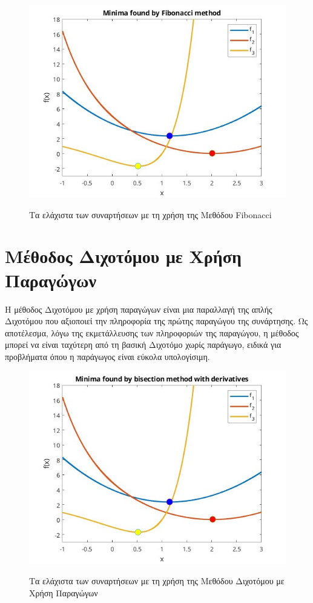 \begin{figure}[H]
    \includegraphics[scale=0.7]{plots/prereqs/fib.jpg}
    \label{fig:funcs}
    \caption{Τα ελάχιστα των συναρτήσεων με τη χρήση της Μεθόδου  Fibonacci}
    \centering
\end{figure}

\section{Μέθοδος Διχοτόμου με Χρήση Παραγώγων}
Η μέθοδος Διχοτόμου με χρήση παραγώγων είναι μια παραλλαγή της απλής Διχοτόμου που αξιοποιεί την πληροφορία της πρώτης παραγώγου της συνάρτησης. Ως αποτέλεσμα, λόγω της εκμετάλλευσης των πληροφοριών της παραγώγου, η μέθοδος μπορεί να είναι ταχύτερη από τη βασική Διχοτόμο χωρίς παράγωγο, ειδικά για προβλήματα όπου η παράγωγος είναι εύκολα υπολογίσιμη.

\begin{figure}[H]
    \includegraphics[scale=0.7]{plots/prereqs/bmd.jpg}
    \label{fig:funcs}
    \caption{Τα ελάχιστα των συναρτήσεων με τη χρήση της Μεθόδου Διχοτόμου με Χρήση Παραγώγων}
    \centering
\end{figure}